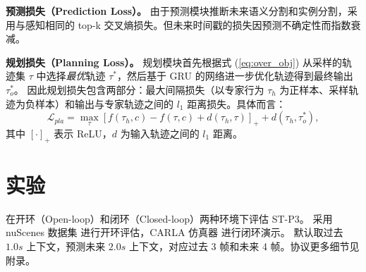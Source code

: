 \documentclass[runningheads]{llncs}
\begin{document}
\noindent\textbf{预测损失（Prediction Loss）。}
%
由于预测模块推断未来语义分割和实例分割，采用与感知相同的 top-k 交叉熵损失。但未来时间戳的损失因预测不确定性而指数衰减。

\noindent\textbf{规划损失（Planning Loss）。}
%
规划模块首先根据式 (\ref{eq:over_obj}) 从采样的轨迹集 $\tau$ 中选择\textit{最优}轨迹 $\tau^*$，然后基于 GRU 的网络进一步优化轨迹得到最终输出 $\tau_o^*$。
%
因此规划损失包含两部分：最大间隔损失（以专家行为 $\tau_h$ 为正样本、采样轨迹为负样本）和输出与专家轨迹之间的 $l_1$ 距离损失。具体而言：
\begin{equation}
    \mathcal{L}_{pla} = \max_{\tau} \left[ f(\tau_h, c) - f(\tau, c) + d(\tau_h, \tau) \right]_+ + d(\tau_h, \tau_o^* ),
\end{equation}
其中 $[ \cdot ]_+$ 表示 ReLU，$d$ 为输入轨迹之间的 $l_1$ 距离。 






\section{实验}\label{sec: experiments}
在开环（Open-loop）和闭环（Closed-loop）两种环境下评估 ST-P3。 
%
采用 nuScenes 数据集\cite{caesar2020nuscenes} 进行开环评估，CARLA 仿真器\cite{dosovitskiy2017carla} 进行闭环演示。
%
默认取过去 $1.0s$ 上下文，预测未来 $2.0s$ 上下文，对应过去 3 帧和未来 4 帧。协议更多细节见附录。



\end{document}
